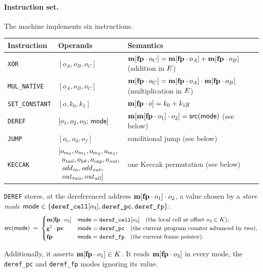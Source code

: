 \paragraph{Instruction set.} The machine implements six instructions.
\begin{center}
\begin{tabularx}{\textwidth}{@{}llX@{}}
\hline
Instruction & Operands & Semantics\\
\hline
\texttt{XOR}           & $[o_A,o_B,o_C]$ & $\mathbf{m}[\mathbf{fp}\cdot o_C]=\mathbf{m}[\mathbf{fp}\cdot o_A]+\mathbf{m}[\mathbf{fp}\cdot o_B]$ (addition in $E$)\\
\texttt{MUL\_NATIVE}   & $[o_A,o_B,o_C]$ & $\mathbf{m}[\mathbf{fp}\cdot o_C]=\mathbf{m}[\mathbf{fp}\cdot o_A]\cdot\mathbf{m}[\mathbf{fp}\cdot o_B]$ (multiplication in $E$)\\
\texttt{SET\_CONSTANT} & $[o,k_0,k_1]$ & $\mathbf{m}[\mathbf{fp}\cdot o]=k_0+k_1y$\\
\texttt{DEREF}         & $[o_1,o_2,o_3;\,\mathsf{mode}]$ & $\mathbf{m}[\mathbf{m}[\mathbf{fp}\cdot o_1]\cdot o_2]=\mathsf{src}(\mathsf{mode})$ (see below)\\
\texttt{JUMP}          & $[o_c,o_d,o_f]$ & conditional jump (see below)\\
\texttt{KECCAK}           & $\begin{array}[t]{@{}l@{}}[o_{m_0},o_{m_1},o_{m_2},o_{m_3},\\ \;\:o_{\mathit{tail}},o_{\mathit{b8}},o_{\mathit{cap}},o_{\mathit{out}},\\ \;\:\mathit{odd}_{\mathit{in}},\mathit{odd}_{\mathit{out}},\\ \;\:\mathit{out}_{\mathit{two}},\mathit{out}_{\mathit{all}}]\end{array}$ & one Keccak permutation (see below)\\
\hline
\end{tabularx}
\end{center}


\texttt{DEREF} stores, at the dereferenced address $\mathbf{m}[\mathbf{fp}\cdot o_1]\cdot o_2$, a value chosen by a \emph{store mode} $\mathsf{mode}\in\{\texttt{deref\_cell}[o_3],\texttt{deref\_pc},\texttt{deref\_fp}\}$:
\[
  \mathsf{src}(\mathsf{mode})\;=\;
  \begin{cases}
    \mathbf{m}[\mathbf{fp}\cdot o_3] & \mathsf{mode}=\texttt{deref\_cell}[o_3] \quad(\text{the local cell at offset }o_3 \in K),\\
    \mathsf{g}^{2}\cdot\mathbf{pc} & \mathsf{mode}=\texttt{deref\_pc} \quad(\text{the current program counter advanced by two}),\\
    \mathbf{fp} & \mathsf{mode}=\texttt{deref\_fp} \quad(\text{the current frame pointer}).
  \end{cases}
\]

Additionally, it asserts $\mathbf{m}[\mathbf{fp}\cdot o_1] \in K$. It reads $\mathbf{m}[\mathbf{fp}\cdot o_3]$ in every mode, the \texttt{deref\_pc} and \texttt{deref\_fp} modes ignoring its value.

